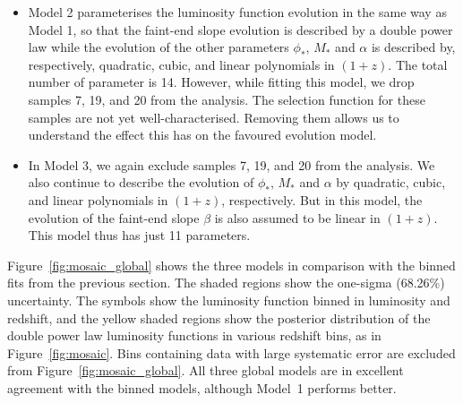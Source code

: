 \documentclass[fleqn,usenatbib]{mnras}
\begin{document}
\begin{itemize}
\item Model 2 parameterises the luminosity function evolution in the
  same way as Model 1, so that the faint-end slope evolution is
  described by a double power law while the evolution of the other
  parameters $\phi_*$, $M_*$ and $\alpha$ is described by,
  respectively, quadratic, cubic, and linear polynomials in $(1+z)$.
  The total number of parameter is 14.  However, while fitting this
  model, we drop samples 7, 19, and 20 from the analysis.  The
  selection function for these samples are not yet well-characterised.
  Removing them allows us to understand the effect this has on the
  favoured evolution model.

\item In Model 3, we again exclude samples 7, 19, and 20 from the
  analysis.  We also continue to describe the evolution of $\phi_*$,
  $M_*$ and $\alpha$ by quadratic, cubic, and linear polynomials in
  $(1+z)$, respectively.  But in this model, the evolution of the
  faint-end slope $\beta$ is also assumed to be linear in $(1+z)$.
  This model thus has just 11 parameters.
\end{itemize}


Figure~\ref{fig:mosaic_global}
shows the three
models in comparison
with the binned fits from the previous section.  The shaded regions
show the one-sigma (68.26\%) uncertainty.  The symbols show the
luminosity function binned in luminosity and redshift, and the yellow
shaded regions show the posterior distribution of the double power law
luminosity functions in various redshift bins, as in
Figure~\ref{fig:mosaic}.  Bins containing data with large systematic
error are excluded from Figure~\ref{fig:mosaic_global}.  All three
global models are in excellent agreement with the binned models,
although Model~1 performs better.
\end{document}
